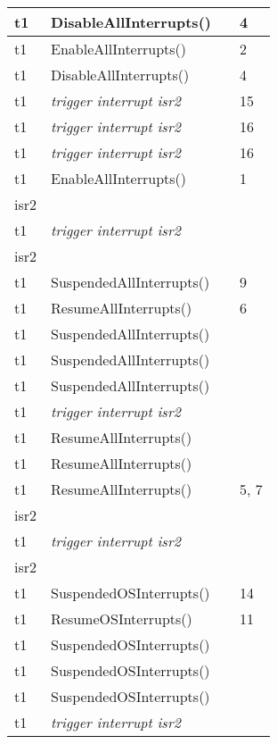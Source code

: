 \documentclass[10pt]{article}
\newlength{\Li}\settowidth{\Li}{Running}
\newlength{\Lii}\setlength{\Lii}{7cm}
\newlength{\Liiii}\setlength{\Liiii}{0.9cm}
\newlength{\Liii}\setlength{\Liii}{\textwidth} \addtolength{\Liii}{-\Li} \addtolength{\Liii}{-\Lii} \addtolength{\Liii}{-\Liiii}
\begin{document}
	\begin{supertabular}{|p{\Li}|p{\Lii}|p{\Liii}|p{\Liiii}|} \hline 
	t1 	& DisableAllInterrupts()			&  			& 4 \\ \hline 
	t1 	& EnableAllInterrupts()			&  			& 2 \\ \hline
	t1 	& DisableAllInterrupts()			&  			& 4 \\ \hline 
	t1 	& \textit{trigger interrupt isr2}		& 		 	& 15 \\ \hline
	t1 	& \textit{trigger interrupt isr2}		& 		 	& 16 \\ \hline 
	t1 	& \textit{trigger interrupt isr2}		& 		 	& 16 \\ \hline 
	t1 	& EnableAllInterrupts()			&  			& 1 \\ \hline
	isr2	& 							& 			&  \\ \hline
	t1	& \textit{trigger interrupt isr2}		& 		 	& \\ \hline 
	isr2	&							&			&  \\ \hline
	t1 	& SuspendedAllInterrupts()		&  			& 9 \\ \hline 
	t1 	& ResumeAllInterrupts()			&  			& 6 \\ \hline 
	t1 	& SuspendedAllInterrupts()		&  			&  \\ \hline 
	t1 	& SuspendedAllInterrupts()		&  			&  \\ \hline 
	t1 	& SuspendedAllInterrupts()		&  			&  \\ \hline 
	t1 	& \textit{trigger interrupt isr2}		& 		 	&  \\ \hline 
	t1 	& ResumeAllInterrupts()			&  			&  \\ \hline 
	t1 	& ResumeAllInterrupts()			&  			&  \\ \hline 
	t1 	& ResumeAllInterrupts()			&  			& 5, 7 \\ \hline 
	isr2	& 							& 			&  \\ \hline
	t1	& \textit{trigger interrupt isr2}		& 		 	&  \\ \hline 
	isr2	&							&			&  \\ \hline
	t1 	& SuspendedOSInterrupts()		&  			& 14 \\ \hline 
	t1 	& ResumeOSInterrupts()			&  			& 11 \\ \hline 
	t1 	& SuspendedOSInterrupts()		&  			&  \\ \hline 
	t1 	& SuspendedOSInterrupts()		&  			&  \\ \hline 
	t1 	& SuspendedOSInterrupts()		&  			&  \\ \hline 
	t1 	& \textit{trigger interrupt isr2}		& 		 	&  \\ \hline 

\end{supertabular}
\end{document}
